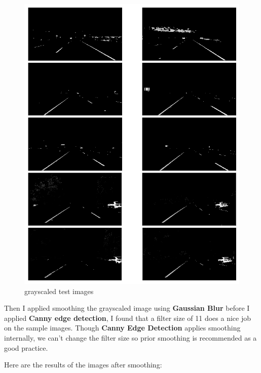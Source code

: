 \documentclass[11pt]{article}
\makeatletter
\def\maxwidth{\ifdim\Gin@nat@width>\linewidth\linewidth
    \else\Gin@nat@width\fi}
\let\Oldincludegraphics\includegraphics
\renewcommand{\includegraphics}[1]{\Oldincludegraphics[width=.8\maxwidth]{#1}}
\makeatother
\begin{document}
\begin{figure}
\centering
\includegraphics{test_images_output/grayscaled_test_images.png}
\caption{grayscaled test images}
\end{figure}

Then I applied smoothing the grayscaled image using \textbf{Gaussian
Blur} before I applied \textbf{Canny edge detection}, I found that a
filter size of 11 does a nice job on the sample images. Though
\textbf{Canny Edge Detection} applies smoothing internally, we can't
change the filter size so prior smoothing is recommended as a good
practice.

Here are the results of the images after smoothing:
\end{document}
